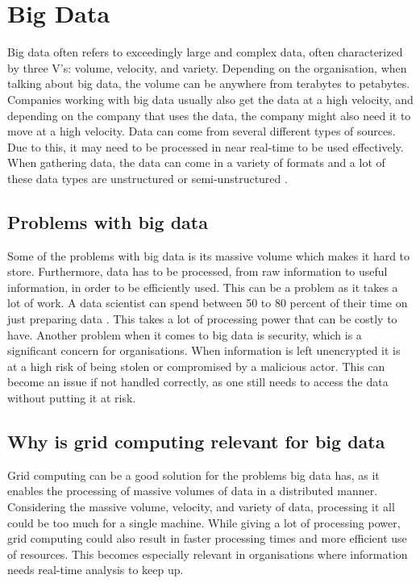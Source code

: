 \section{Big Data}
Big data often refers to exceedingly large and complex data, often characterized by three V's: volume, velocity, and variety. Depending on the organisation, when talking about big data, the volume can be anywhere from terabytes to petabytes. Companies working with big data usually also get the data at a high velocity, and depending on the company that uses the data, the company might also need it to move at a high velocity. Data can come from several different types of sources. Due to this, it may need to be processed in near real-time to be used effectively. When gathering data, the data can come in a variety of formats and a lot of these data types are unstructured or semi-unstructured \cite{big_data_oracle}.

\subsection{Problems with big data}
Some of the problems with big data is its massive volume which makes it hard to store. Furthermore, data has to be processed, from raw information to useful information, in order to be efficiently used. This can be a problem as it takes a lot of work. A data scientist can spend between 50 to 80 percent of their time on just preparing data \cite{big_data_oracle}. This takes a lot of processing power that can be costly to have. Another problem when it comes to big data is security, which is a significant concern for organisations. When information is left unencrypted it is at a high risk of being stolen or compromised by a malicious actor. This can become an issue if not handled correctly, as one still needs to access the data without putting it at risk.

\subsection{Why is grid computing relevant for big data}
Grid computing can be a good solution for the problems big data has, as it enables the processing of massive volumes of data in a distributed manner. Considering the massive volume, velocity, and variety of data, processing it all could be too much for a single machine. While giving a lot of processing power, grid computing could also result in faster processing times and more efficient use of resources. This becomes especially relevant in organisations where information needs real-time analysis to keep up.
